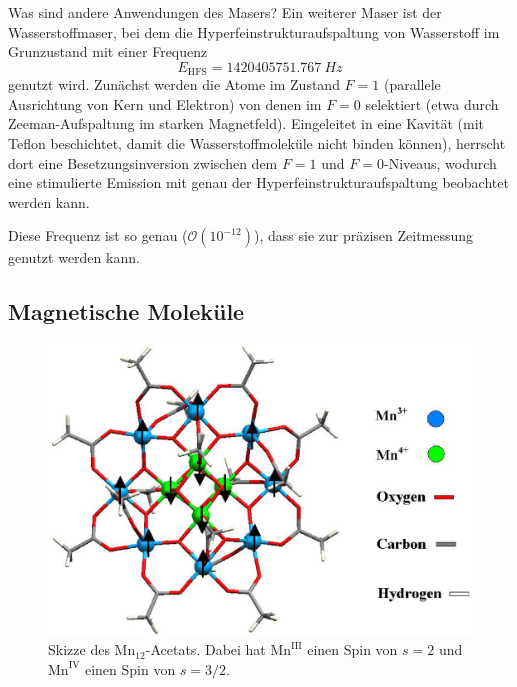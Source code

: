 

\begin{fquestion}{Was sind andere Anwendungen des Masers?}
    Ein weiterer Maser ist der Wasserstoffmaser, bei dem die Hyperfeinstrukturaufspaltung von Wasserstoff im Grunzustand mit einer Frequenz 
    $$E_{\mathrm{HFS}} = \SI{1420405751.767}{Hz}$$
    genutzt wird.
    Zunächst werden die Atome im Zustand $F = 1$ (parallele Ausrichtung von Kern und Elektron) von denen im $F=0$ selektiert (etwa durch Zeeman-Aufspaltung im starken Magnetfeld).
    Eingeleitet in eine Kavität (mit Teflon beschichtet, damit die Wasserstoffmoleküle nicht binden können), herrscht dort eine Besetzungsinversion zwischen dem $F=1$ und $F=0$-Niveaus, wodurch eine stimulierte Emission mit genau der Hyperfeinstrukturaufspaltung beobachtet werden kann.
    
    Diese Frequenz ist so genau ($\mathcal{O}(10^{-12})$), dass sie zur präzisen Zeitmessung genutzt werden kann.
\end{fquestion}

\subsection{Magnetische Moleküle}

\begin{figure}[htb]
    \centering
    \includegraphics[width=0.5\linewidth]{img/17-Figure1.1-1.png}
    \caption{Skizze des $\text{Mn}_{12}$-Acetats. Dabei hat $\text{Mn}^{\text{III}}$ einen Spin von $s=2$ und $\text{Mn}^{\text{IV}}$ einen Spin von $s=3/2$.}
    \label{fig:mn12acetat}
\end{figure}

